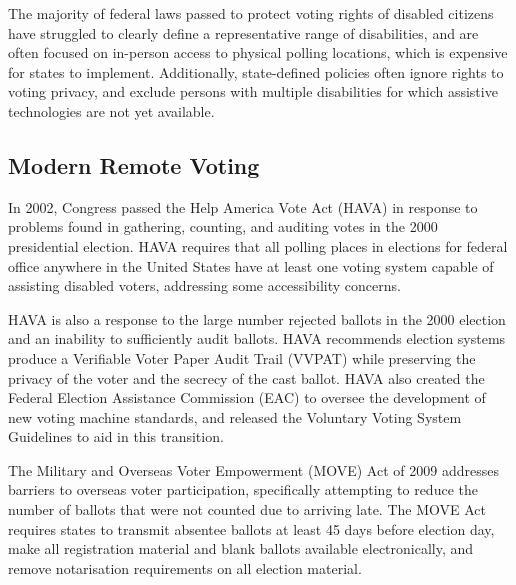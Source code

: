 The majority of federal laws passed to protect voting rights of
disabled citizens have struggled to clearly define a representative
range of disabilities, and are often focused on in-person access to
physical polling locations, which is expensive for states to
implement. Additionally, state-defined policies often ignore rights to
voting privacy, and exclude persons with multiple disabilities for
which assistive technologies are not yet available.

\subsection{Modern Remote Voting}

In 2002, Congress passed the Help America Vote Act (HAVA) in response
to problems found in gathering, counting, and auditing votes in the
2000 presidential election. HAVA requires that all polling places in
elections for federal office anywhere in the United States have at
least one voting system capable of assisting disabled voters,
addressing some accessibility concerns.

HAVA is also a response to the large number rejected ballots in the
2000 election and an inability to sufficiently audit ballots. HAVA
recommends election systems produce a Verifiable Voter Paper Audit
Trail (VVPAT) while preserving the privacy of the voter and the
secrecy of the cast ballot. HAVA also created the Federal Election
Assistance Commission (EAC) to oversee the development of new voting
machine standards, and released the Voluntary Voting System Guidelines
to aid in this transition.

The Military and Overseas Voter Empowerment (MOVE) Act of 2009
addresses barriers to overseas voter participation, specifically
attempting to reduce the number of ballots that were not counted due
to arriving late. The MOVE Act requires states to transmit absentee
ballots at least 45 days before election day, make all registration
material and blank ballots available electronically, and remove
notarisation requirements on all election material.


